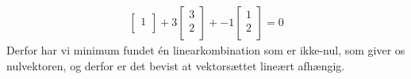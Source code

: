 \begin{eks}
\begin{align*}
\begin{bmatrix}
           1 \\
\end{bmatrix}
+ 3
\begin{bmatrix}
           3 \\
           2 \\
\end{bmatrix}
+ -1
\begin{bmatrix}
           1 \\
           2 \\
\end{bmatrix}
=0
\end{align*}
%
Derfor har vi minimum fundet én linearkombination som er ikke-nul, som giver os nulvektoren, og derfor er det bevist at vektorsættet lineært afhængig.
\end{eks}
%
%